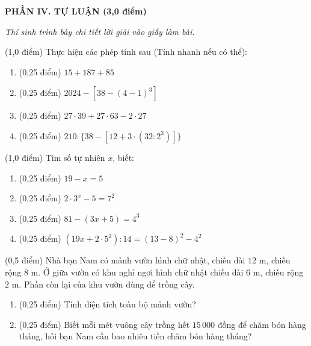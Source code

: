 \documentclass[12pt,a4paper]{article}
\begin{document}
\setcounter{ex}{0}
\noindent\textbf{\large PHẦN IV. TỰ LUẬN (3,0 điểm)}

\textit{Thí sinh trình bày chi tiết lời giải vào giấy làm bài.}

\vspace{1mm}
\begin{ex} (1,0 điểm)
Thực hiện các phép tính sau (Tính nhanh nếu có thể):
\begin{enumerate}[label=\textbf{\alph*)}, leftmargin=0.8cm, itemsep=2pt]
\item (0,25 điểm) $15 + 187 + 85$
\item (0,25 điểm) $2024 - [38 - (4 - 1)^3]$
\item (0,25 điểm) $27 \cdot 39 + 27 \cdot 63 - 2 \cdot 27$
\item (0,25 điểm) $210 : \{38 - [12 + 3 \cdot (32 : 2^3)]\}$
\end{enumerate}
\end{ex}
\vspace{1.5mm}

\begin{ex} (1,0 điểm)
Tìm số tự nhiên $x$, biết:
\begin{enumerate}[label=\textbf{\alph*)}, leftmargin=0.8cm, itemsep=2pt]
\item (0,25 điểm) $19 - x = 5$
\item (0,25 điểm) $2 \cdot 3^x - 5 = 7^2$
\item (0,25 điểm) $81 - (3x + 5) = 4^3$
\item (0,25 điểm) $(19x + 2 \cdot 5^2) : 14 = (13 - 8)^2 - 4^2$
\end{enumerate}
\end{ex}
\vspace{1.5mm}

\begin{ex} (0,5 điểm)
Nhà bạn Nam có mảnh vườn hình chữ nhật, chiều dài $12\text{ m}$, chiều rộng $8\text{ m}$. Ở giữa vườn có khu nghỉ ngơi hình chữ nhật chiều dài $6\text{ m}$, chiều rộng $2\text{ m}$. Phần còn lại của khu vườn dùng để trồng cây.
\begin{center}
\end{center}
\begin{enumerate}[label=\textbf{\alph*)}, leftmargin=0.8cm, itemsep=2pt]
\item (0,25 điểm) Tính diện tích toàn bộ mảnh vườn?
\item (0,25 điểm) Biết mỗi mét vuông cây trồng hết $15\,000$ đồng để chăm bón hàng tháng, hỏi bạn Nam cần bao nhiêu tiền chăm bón hàng tháng?
\end{enumerate}
\end{ex}
\vspace{1.5mm}
\end{document}
